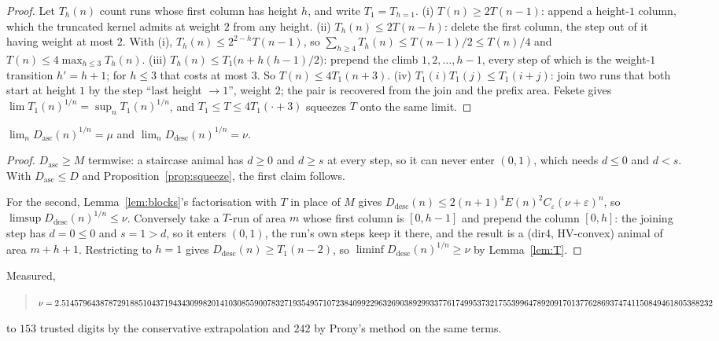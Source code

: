 \documentclass[11pt]{article}
\begin{document}
\begin{proof}
Let $T_h(n)$ count runs whose first column has height $h$, and write
$T_1 = T_{h=1}$.
(i) $T(n) \ge 2T(n{-}1)$: append a height-$1$ column, which the truncated kernel
admits at weight $2$ from any height.
(ii) $T_h(n) \le 2T(n{-}h)$: delete the first column, the step out of it having
weight at most $2$. With (i), $T_h(n) \le 2^{2-h}T(n{-}1)$, so
$\sum_{h\ge4}T_h(n) \le T(n{-}1)/2 \le T(n)/4$ and
$T(n) \le 4\max_{h\le3}T_h(n)$.
(iii) $T_h(n) \le T_1\bigl(n + h(h{-}1)/2\bigr)$: prepend the climb
$1,2,\dots,h{-}1$, every step of which is the weight-$1$ transition $h' = h+1$;
for $h \le 3$ that costs at most $3$. So $T(n) \le 4T_1(n{+}3)$.
(iv) $T_1(i)T_1(j) \le T_1(i{+}j)$: join two runs that both start at height $1$
by the step ``last height $\to 1$'', weight $2$; the pair is recovered from the
join and the prefix area.
Fekete gives $\lim T_1(n)^{1/n} = \sup_n T_1(n)^{1/n}$, and
$T_1 \le T \le 4T_1(\cdot{+}3)$ squeezes $T$ onto the same limit.
\end{proof}

\begin{proposition}
\label{prop:split}
$\lim_n D_{\mathrm{asc}}(n)^{1/n} = \mu$ and
$\lim_n D_{\mathrm{desc}}(n)^{1/n} = \nu$.
\end{proposition}

\begin{proof}
$D_{\mathrm{asc}} \ge M$ termwise: a staircase animal has $d \ge 0$ and
$d \ge s$ at every step, so it can never enter $(0,1)$, which needs $d \le 0$
and $d < s$. With $D_{\mathrm{asc}} \le D$ and
Proposition~\ref{prop:squeeze}, the first claim follows.

For the second, Lemma~\ref{lem:blocks}'s factorisation with $T$ in place of $M$
gives $D_{\mathrm{desc}}(n) \le 2(n{+}1)^4E(n)^2C_\varepsilon(\nu+\varepsilon)^n$,
so $\limsup D_{\mathrm{desc}}(n)^{1/n} \le \nu$. Conversely take a $T$-run of
area $m$ whose first column is $[0,h{-}1]$ and prepend the column $[0,h]$: the
joining step has $d = 0 \le 0$ and $s = 1 > d$, so it enters $(0,1)$, the run's
own steps keep it there, and the result is a (dir4, HV-convex) animal of area
$m + h + 1$. Restricting to $h = 1$ gives $D_{\mathrm{desc}}(n) \ge T_1(n{-}2)$,
so $\liminf D_{\mathrm{desc}}(n)^{1/n} \ge \nu$ by Lemma~\ref{lem:T}.
\end{proof}

Measured,
\begin{quote}\small
$\nu = 2.5145796438787291885104371943430998201410308559007832719354957107238\\
4099229632690389299337761749953732175539964789209170137762869374741150849461805388232$
\end{quote}
to $153$ trusted digits by the conservative extrapolation and $242$ by Prony's
method on the same terms.
\end{document}
